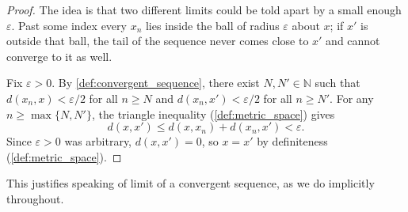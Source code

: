 \begin{proof}
The idea is that two different limits could be told apart by a small enough $\varepsilon$. Past
some index every $x_n$ lies inside the ball of radius $\varepsilon$ about $x$; if $x'$ is outside
that ball, the tail of the sequence never comes close to $x'$ and cannot converge to it as well.
\begin{center}
\end{center}
Fix $\varepsilon > 0$. By \cref{def:convergent_sequence}, there exist $N, N' \in \mathbb{N}$ such
that $d(x_n,x) < \varepsilon/2$ for all $n \geq N$ and $d(x_n,x') < \varepsilon/2$ for all
$n \geq N'$. For any $n \geq \max\{N,N'\}$, the triangle inequality (\cref{def:metric_space})
gives
\[d(x,x') \leq d(x,x_n) + d(x_n,x') < \varepsilon.\]
Since $\varepsilon > 0$ was arbitrary, $d(x,x') = 0$, so $x = x'$ by definiteness
(\cref{def:metric_space}).
\end{proof}

This justifies speaking of  limit of a convergent sequence, as we do implicitly
throughout.

